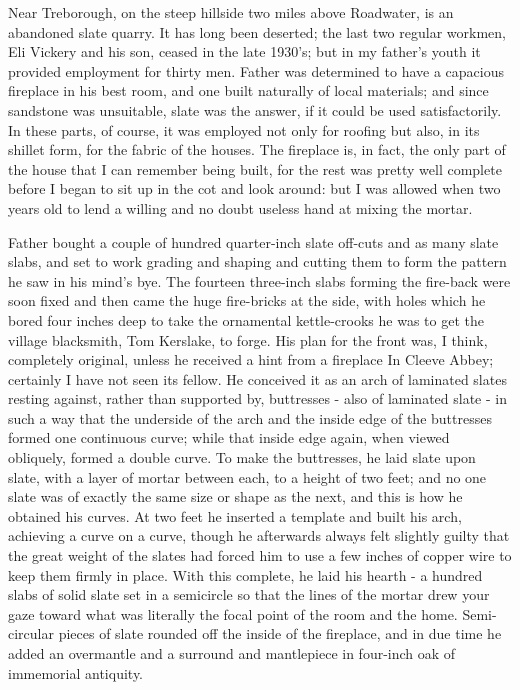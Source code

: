 Near Treborough, on the steep hillside two miles above Roadwater, is an abandoned slate quarry. It has long been deserted; the last two regular workmen, Eli Vickery and his son, ceased in the late 1930's; but in my father's youth it provided employment for thirty men. Father was determined to have a capacious fireplace in his best room, and one built naturally of local materials; and since sandstone was unsuitable, slate was the answer, if it could be used satisfactorily. In these parts, of course, it was employed not only for roofing but also, in its shillet form, for the fabric of the houses. The fireplace is, in fact, the only part of the house that I can remember being built, for the rest was pretty well complete before I began to sit up in the cot and look around: but I was allowed when two years old to lend a willing and no doubt useless hand at mixing the mortar.
 

Father bought a couple of hundred quarter-inch slate off-cuts and as many slate slabs, and set to work grading and shaping and cutting them to form the pattern he saw in his mind's bye. The fourteen three-inch slabs forming the fire-back were soon fixed and then came the huge fire-bricks at the side, with holes which he bored four inches deep to take the ornamental kettle-crooks he was to get the village blacksmith, Tom Kerslake, to forge. His plan for the front was, I think, completely original, unless he received a hint from a fireplace In Cleeve Abbey; certainly I have not seen its fellow. He conceived it as an arch of laminated slates resting against, rather than supported by, buttresses - also of laminated slate - in such a way that the underside of the arch and the inside edge of the buttresses formed one continuous curve; while that inside edge again, when viewed obliquely, formed a double curve. To make the buttresses, he laid slate upon slate, with a layer of mortar between each, to a height of two feet; and no one slate was of exactly the same size or shape as the next, and this is how he obtained his curves. At two feet he inserted a template and built his arch, achieving a curve on a curve, though he afterwards always felt slightly guilty that the great weight of the slates had forced him to use a few inches of copper wire to keep them firmly in place. With this complete, he laid his hearth - a hundred slabs of solid slate set in a semicircle so that the lines of the mortar drew your gaze toward what was literally the focal point of the room and the home. Semi-circular pieces of slate rounded off the inside of the fireplace, and in due time he added an overmantle and a surround and mantlepiece in four-inch oak of immemorial antiquity.

